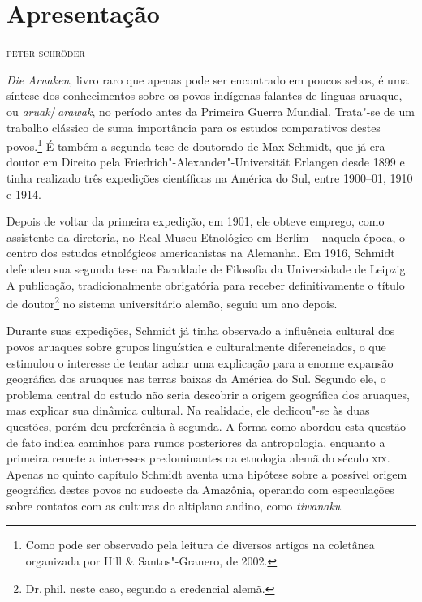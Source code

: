 \newcommand{\subtitulo}[1]{\NoCaseChange{\textnormal{\break\Large\itshape#1}}}
\chapter*{Apresentação\smallskip\subtitulo{Um clássico da etnologia\\ sul-americanista}}


\begin{flushright}
\textsc{peter schröder}\medskip
\end{flushright}

\noindent{}\textit{Die Aruaken}, livro raro que apenas pode ser encontrado em poucos
sebos, é uma síntese dos conhecimentos sobre os povos indígenas falantes
de línguas aruaque, ou \textit{aruak}/\,\textit{arawak}, no período antes da Primeira Guerra Mundial. Trata"-se de um trabalho clássico de suma importância para os
estudos comparativos destes povos.\footnote{Como pode ser observado pela
leitura de diversos artigos na coletânea organizada por Hill \&
Santos"-Granero, de 2002.} É também a segunda tese de doutorado de Max Schmidt, que já era doutor em Direito pela Friedrich"-Alexander"-Universität Erlangen desde 1899 e tinha realizado três expedições científicas na América do Sul, entre 1900--01, 1910 e 1914. 

Depois de voltar da primeira expedição, em 1901, ele obteve emprego, como assistente da diretoria, no Real Museu Etnológico em Berlim -- naquela época, o centro dos estudos etnológicos americanistas na Alemanha. Em 1916, Schmidt defendeu sua segunda tese na Faculdade de Filosofia da Universidade de Leipzig. A publicação, tradicionalmente obrigatória para receber definitivamente o título de doutor\footnote{Dr.\,phil. neste caso, segundo a credencial alemã.} no sistema universitário alemão, seguiu um ano depois.

Durante suas expedições, Schmidt já tinha observado a influência cultural
dos povos aruaques sobre grupos linguística e culturalmente
diferenciados, o que estimulou o interesse de tentar achar uma
explicação para a enorme expansão geográfica dos aruaques nas terras
baixas da América do Sul. Segundo ele, o problema central do estudo
não seria descobrir a origem geográfica dos aruaques, mas explicar sua
dinâmica cultural. Na realidade, ele dedicou"-se às duas questões, porém
deu preferência à segunda. A forma como abordou esta questão de fato
indica caminhos para rumos posteriores da antropologia, enquanto a
primeira remete a interesses predominantes na etnologia alemã do século
\textsc{xix}. Apenas no quinto capítulo Schmidt aventa uma hipótese sobre a possível origem geográfica destes povos no sudoeste da Amazônia, operando com
especulações sobre contatos com as culturas do altiplano andino, como
\textit{tiwanaku}.

